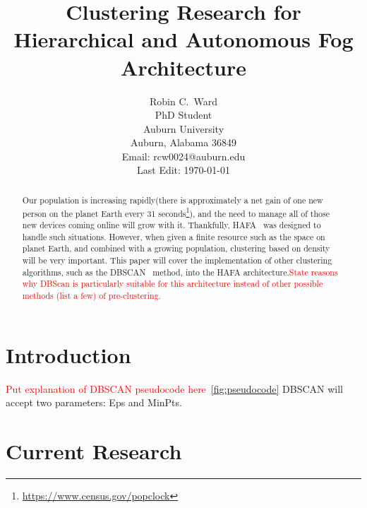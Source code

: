 \documentclass[letterpaper,twocolumn,10pt]{article}
\newcommand\todo[1]{\textcolor{red}{#1}}
\begin{document}
\title{\Large \bf Clustering Research for Hierarchical and Autonomous Fog Architecture}

\author{
{\rm Robin C.\ Ward}\\
PhD Student\\
Auburn University\\
Auburn, Alabama 36849\\
Email: rcw0024@auburn.edu\\
Last Edit: \today
}

\maketitle

\begin{abstract}
Our population is increasing rapidly(there is approximately a net gain of one new person on the planet Earth every 31 seconds\footnote{\url{https://www.census.gov/popclock}}), and the need to manage all of those new devices coming online will grow with it. Thankfully, HAFA~\cite{10.1145/3229710.3229740} was designed to handle such situations. However, when given a finite resource such as the space on planet Earth, and combined with a growing population, clustering based on density will be very important. This paper will cover the implementation of other clustering algorithms, such as the DBSCAN~\cite{10.5555/3001460.3001507} method, into the HAFA architecture.\todo{State reasons why DBScan is particularly suitable for this architecture instead of other possible methods (list a few) of pre-clustering.}
\end{abstract}

\section{Introduction}
\todo{Put explanation of DBSCAN pseudocode here}~\ref{fig:pseudocode}
DBSCAN will accept two parameters: Eps and MinPts.

\section{Current Research}
\end{document}
